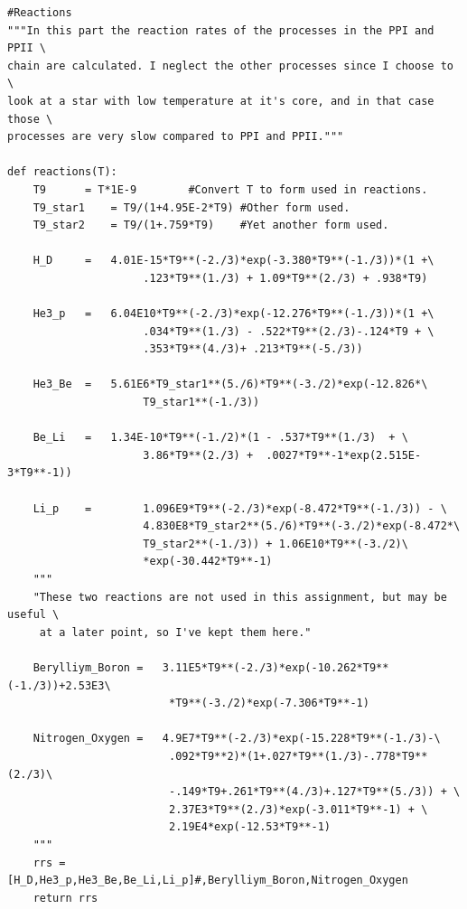 \documentclass[a4paper,12pt]{article}
\begin{document}
\begin{verbatim}
#Reactions
"""In this part the reaction rates of the processes in the PPI and PPII \
chain are calculated. I neglect the other processes since I choose to \
look at a star with low temperature at it's core, and in that case those \
processes are very slow compared to PPI and PPII."""

def reactions(T):
	T9 		= T*1E-9		#Convert T to form used in reactions.
	T9_star1 	= T9/(1+4.95E-2*T9)	#Other form used.
	T9_star2 	= T9/(1+.759*T9)	#Yet another form used.

	H_D   	= 	4.01E-15*T9**(-2./3)*exp(-3.380*T9**(-1./3))*(1 +\
                     .123*T9**(1./3) + 1.09*T9**(2./3) + .938*T9)

	He3_p	= 	6.04E10*T9**(-2./3)*exp(-12.276*T9**(-1./3))*(1 +\
                     .034*T9**(1./3) - .522*T9**(2./3)-.124*T9 + \
                     .353*T9**(4./3)+ .213*T9**(-5./3))

	He3_Be  = 	5.61E6*T9_star1**(5./6)*T9**(-3./2)*exp(-12.826*\
                     T9_star1**(-1./3))

	Be_Li   = 	1.34E-10*T9**(-1./2)*(1 - .537*T9**(1./3)  + \
                     3.86*T9**(2./3) +  .0027*T9**-1*exp(2.515E-3*T9**-1))

	Li_p	= 	     1.096E9*T9**(-2./3)*exp(-8.472*T9**(-1./3)) - \
                     4.830E8*T9_star2**(5./6)*T9**(-3./2)*exp(-8.472*\
                     T9_star2**(-1./3)) + 1.06E10*T9**(-3./2)\
                     *exp(-30.442*T9**-1)
	"""
	"These two reactions are not used in this assignment, but may be useful \
     at a later point, so I've kept them here."
     
	Berylliym_Boron = 	3.11E5*T9**(-2./3)*exp(-10.262*T9**(-1./3))+2.53E3\
                         *T9**(-3./2)*exp(-7.306*T9**-1)

	Nitrogen_Oxygen = 	4.9E7*T9**(-2./3)*exp(-15.228*T9**(-1./3)-\
                         .092*T9**2)*(1+.027*T9**(1./3)-.778*T9**(2./3)\
                         -.149*T9+.261*T9**(4./3)+.127*T9**(5./3)) + \
                         2.37E3*T9**(2./3)*exp(-3.011*T9**-1) + \
                         2.19E4*exp(-12.53*T9**-1)
	"""
	rrs = [H_D,He3_p,He3_Be,Be_Li,Li_p]#,Berylliym_Boron,Nitrogen_Oxygen
	return rrs


\end{verbatim}
\end{document}
